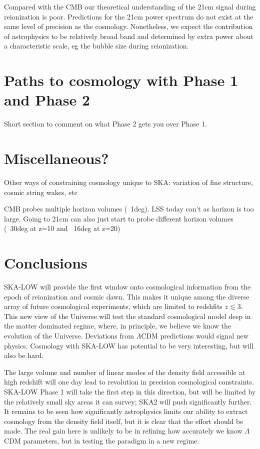 \documentclass{PoS}
\begin{document}
Compared with the CMB our theoretical understanding of the 21cm signal during reionization is poor. Predictions for the 21cm power spectrum do not exist at the same level of precision as the cosmology. Nonetheless, we expect the contribution of astrophysics to be relatively broad band and determined by extra power about a characteristic scale, eg the bubble size during reionization.

\section{Paths to cosmology with Phase 1 and Phase 2}

Short section to comment on what Phase 2 gets you over Phase 1.

\section{Miscellaneous?}

Other ways of constraining cosmology unique to SKA: variation of fine structure, cosmic string wakes, etc

CMB probes multiple horizon volumes (~1deg). LSS today can't as horizon is too large. Going to 21cm can also just start to probe different horizon volumes (~30deg at z=10 and ~16deg at z=20)

\section{Conclusions}

SKA-LOW will provide the first window onto cosmological information from the epoch of reionization and cosmic dawn. This makes it unique among the diverse array of future cosmological experiments, which are limited to redshfits $z\lesssim3$. This new view of the Universe will test the standard cosmological model deep in the matter dominated regime, where, in principle, we believe we know the evolution of the Universe. Deviations from $\Lambda$CDM predictions would signal new physics. Cosmology with SKA-LOW has potential to be very interesting, but will also be hard.

The large volume and number of linear modes of the density field accessible at high redshift will one day lead to revolution in precision cosmological constraints. SKA-LOW Phase 1 will take the first step in this direction, but will be limited by the relatively small sky areas it can survey; SKA2 will push significantly further. It remains to be seen how significantly astrophysics limits our ability to extract cosmology from the density field itself, but it is clear that the effort should be made. The real gain here is unlikely to be in refining how accurately we know $\Lambda$CDM parameters, but in testing the paradigm in a new regime.
\end{document}
